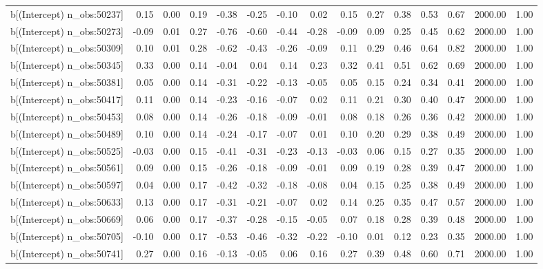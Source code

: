 \begin{table}[ht]
\begin{tabular}{rrrrrrrrrrrrrrr}
  b[(Intercept) n\_obs:50237] & 0.15 & 0.00 & 0.19 & -0.38 & -0.25 & -0.10 & 0.02 & 0.15 & 0.27 & 0.38 & 0.53 & 0.67 & 2000.00 & 1.00 \\ 
  b[(Intercept) n\_obs:50273] & -0.09 & 0.01 & 0.27 & -0.76 & -0.60 & -0.44 & -0.28 & -0.09 & 0.09 & 0.25 & 0.45 & 0.62 & 2000.00 & 1.00 \\ 
  b[(Intercept) n\_obs:50309] & 0.10 & 0.01 & 0.28 & -0.62 & -0.43 & -0.26 & -0.09 & 0.11 & 0.29 & 0.46 & 0.64 & 0.82 & 2000.00 & 1.00 \\ 
  b[(Intercept) n\_obs:50345] & 0.33 & 0.00 & 0.14 & -0.04 & 0.04 & 0.14 & 0.23 & 0.32 & 0.41 & 0.51 & 0.62 & 0.69 & 2000.00 & 1.00 \\ 
  b[(Intercept) n\_obs:50381] & 0.05 & 0.00 & 0.14 & -0.31 & -0.22 & -0.13 & -0.05 & 0.05 & 0.15 & 0.24 & 0.34 & 0.41 & 2000.00 & 1.00 \\ 
  b[(Intercept) n\_obs:50417] & 0.11 & 0.00 & 0.14 & -0.23 & -0.16 & -0.07 & 0.02 & 0.11 & 0.21 & 0.30 & 0.40 & 0.47 & 2000.00 & 1.00 \\ 
  b[(Intercept) n\_obs:50453] & 0.08 & 0.00 & 0.14 & -0.26 & -0.18 & -0.09 & -0.01 & 0.08 & 0.18 & 0.26 & 0.36 & 0.42 & 2000.00 & 1.00 \\ 
  b[(Intercept) n\_obs:50489] & 0.10 & 0.00 & 0.14 & -0.24 & -0.17 & -0.07 & 0.01 & 0.10 & 0.20 & 0.29 & 0.38 & 0.49 & 2000.00 & 1.00 \\ 
  b[(Intercept) n\_obs:50525] & -0.03 & 0.00 & 0.15 & -0.41 & -0.31 & -0.23 & -0.13 & -0.03 & 0.06 & 0.15 & 0.27 & 0.35 & 2000.00 & 1.00 \\ 
  b[(Intercept) n\_obs:50561] & 0.09 & 0.00 & 0.15 & -0.26 & -0.18 & -0.09 & -0.01 & 0.09 & 0.19 & 0.28 & 0.39 & 0.47 & 2000.00 & 1.00 \\ 
  b[(Intercept) n\_obs:50597] & 0.04 & 0.00 & 0.17 & -0.42 & -0.32 & -0.18 & -0.08 & 0.04 & 0.15 & 0.25 & 0.38 & 0.49 & 2000.00 & 1.00 \\ 
  b[(Intercept) n\_obs:50633] & 0.13 & 0.00 & 0.17 & -0.31 & -0.21 & -0.07 & 0.02 & 0.14 & 0.25 & 0.35 & 0.47 & 0.57 & 2000.00 & 1.00 \\ 
  b[(Intercept) n\_obs:50669] & 0.06 & 0.00 & 0.17 & -0.37 & -0.28 & -0.15 & -0.05 & 0.07 & 0.18 & 0.28 & 0.39 & 0.48 & 2000.00 & 1.00 \\ 
  b[(Intercept) n\_obs:50705] & -0.10 & 0.00 & 0.17 & -0.53 & -0.46 & -0.32 & -0.22 & -0.10 & 0.01 & 0.12 & 0.23 & 0.35 & 2000.00 & 1.00 \\ 
  b[(Intercept) n\_obs:50741] & 0.27 & 0.00 & 0.16 & -0.13 & -0.05 & 0.06 & 0.16 & 0.27 & 0.39 & 0.48 & 0.60 & 0.71 & 2000.00 & 1.00 \\ 

\end{tabular}
\end{table}
